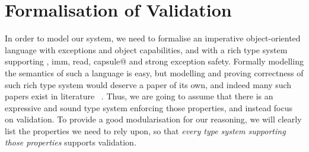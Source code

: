 \saveSpace
\section{Formalisation of Validation}
\label{s:meaning}
\saveSpace
In order to model our system, we need to formalise an imperative object-oriented language
with exceptions and object capabilities,  and with a rich type system
supporting \Q@mut, imm, read, capsule@ and strong exception safety.
Formally modelling the semantics of such a language is easy, but 
modelling and proving correctness of such rich type system would deserve a paper
of its own, and indeed many such papers exist in literature%
~\cite{ServettoEtAl13a,ServettoZucca15,GordonEtAl12,clebsch2015deny,JOT:issue_2011_01/article1}.
Thus, we are going to assume that there is an expressive and sound type system enforcing
those properties, and instead focus on validation.
To provide a good modularisation for our reasoning, 
we will clearly list the properties we need to rely upon, so that \emph{every type
system supporting those properties} supports validation.

